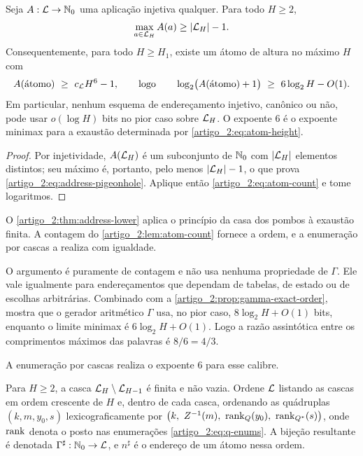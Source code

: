 \begin{theorem}\label{map:artigo_2:3.4}\label{artigo_2:thm:address-lower}
Seja $A:\mathcal{L}\to\mathbb{N}_0$ uma aplicação injetiva qualquer. Para todo $H\ge2$,
\begin{equation}
 \max_{a\in\mathcal{L}_H}A(a)\ge |\mathcal{L}_H|-1.
 \label{artigo_2:eq:address-pigeonhole}
\end{equation}
Consequentemente, para todo $H\ge H_1$, existe um átomo de altura no máximo
$H$ com
\begin{equation}
 A(\text{átomo})\ \ge\ c_{\mathcal{L}} H^6-1,
 \qquad\text{logo}\qquad
 \log_2\bigl(A(\text{átomo})+1\bigr)\ \ge\ 6\log_2H-O(1).
 \label{artigo_2:eq:address-lower}
\end{equation}
Em particular, nenhum esquema de endereçamento injetivo, canônico ou não,
pode usar $o(\log H)$ bits no pior caso sobre $\mathcal{L}_H$. O expoente $6$ é
o expoente minimax para a exaustão determinada por \eqref{artigo_2:eq:atom-height}.
\end{theorem}

\begin{proof}
Por injetividade, $A(\mathcal{L}_H)$ é um subconjunto de $\mathbb{N}_0$ com
$|\mathcal{L}_H|$ elementos distintos; seu máximo é, portanto, pelo menos
$|\mathcal{L}_H|-1$, o que prova \eqref{artigo_2:eq:address-pigeonhole}. Aplique então
\eqref{artigo_2:eq:atom-count} e tome logaritmos.
\end{proof}

O \cref{artigo_2:thm:address-lower} aplica o princípio da casa dos pombos à exaustão finita. A contagem do \cref{artigo_2:lem:atom-count} fornece a ordem, e a enumeração por cascas a realiza com igualdade.

\begin{remark}\label{map:artigo_2:3.5}
O argumento é puramente de contagem e não usa nenhuma propriedade de $\Gamma$. Ele vale igualmente para endereçamentos que dependam de tabelas, de estado ou de escolhas arbitrárias. Combinado com a \cref{artigo_2:prop:gamma-exact-order}, mostra que o gerador aritmético $\Gamma$ usa, no pior caso, $8\log_2H+O(1)$ bits, enquanto o limite minimax é $6\log_2H+O(1)$. Logo a razão assintótica entre os comprimentos máximos das palavras é $8/6=4/3$.
\end{remark}

A enumeração por cascas realiza o expoente $6$ para esse calibre.

\begin{definition}\label{map:artigo_2:3.6}\label{artigo_2:def:sharp}
Para $H\ge2$, a casca $\mathcal{L}_H\setminus\mathcal{L}_{H-1}$ é finita e não vazia. Ordene $\mathcal{L}$ listando as cascas em ordem crescente de $H$ e, dentro de cada casca, ordenando as quádruplas $(k,m,y_0,s)$ lexicograficamente por $\bigl(k,\ Z^{-1}(m),\ \rank_Q(y_0),\ \rank_{Q^*}(s)\bigr)$, onde $\operatorname{rank}$ denota o posto nas enumerações \eqref{artigo_2:eq:q-enums}. A bijeção resultante é denotada $\Gamma^\sharp:\mathbb{N}_0\to\mathcal{L}$, e $n^\sharp$ é o endereço de um átomo nessa ordem.
\end{definition}

